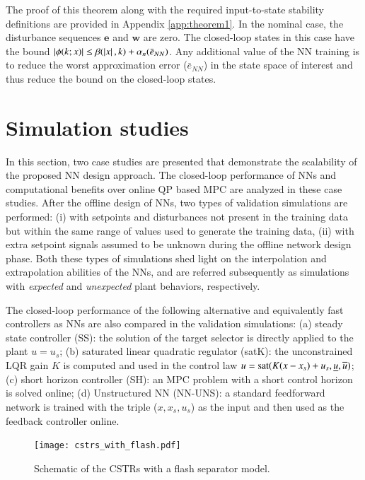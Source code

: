 \documentclass[preprint,5p, twocolumn, authoryear]{elsarticle}
\begin{document}
The proof of this theorem along with the required input-to-state stability
definitions are provided in Appendix \ref{app:theorem1}. In the nominal case,
the disturbance sequences $\mathbf{e}$ and $\mathbf{w}$ are zero. The
closed-loop states in this case have the bound $\left| \phi(k; x) \right| \leq
\beta(\left| x \right|, k) + \alpha_n(\bar{e}_{NN})$. Any additional value of the NN
training is to reduce the worst approximation error ($\bar{e}_{NN}$) in the
state space of interest and thus reduce the bound on the closed-loop states. 

\section{Simulation studies} \label{sec:simulation_studies}

In this section, two case studies are presented that demonstrate the scalability
of the proposed NN design approach. The closed-loop performance of NNs and
computational benefits over online QP based MPC are analyzed in these case
studies. After the offline design of NNs, two types of validation simulations
are performed: (i) with setpoints and disturbances not present in the training
data but within the same range of values used to generate the training data,
(ii) with extra setpoint signals assumed to be unknown during the offline
network design phase. Both these types of simulations shed light on 
the interpolation and extrapolation abilities of the NNs, and are referred
subsequently as simulations with \textit{expected} and \textit{unexpected} plant
behaviors, respectively.

The closed-loop performance of the following alternative and equivalently fast
controllers as NNs are also compared in the validation simulations: (a) steady
state controller (SS): the solution of the target selector is directly applied
to the plant $u = u_s$; (b) saturated linear quadratic regulator (satK): the
unconstrained LQR gain $K$ is computed and used in the control law $u =
\textnormal{sat}(K(x-x_s) + u_s, \underline{u}, \overline{u})$; (c) short
horizon controller (SH): an MPC problem with a short control horizon is solved
online; (d) Unstructured NN (NN-UNS): a standard feedforward network is trained
with the triple ($x, x_s, u_s$) as the input and then used as the feedback
controller online.

\begin{figure}[h]
    \centering
    \texttt{[image: cstrs\_with\_flash.pdf]}
    \caption{Schematic of the CSTRs with a flash separator model.}
    \label{fig:schematic_cstrs}
\end{figure}
\end{document}
